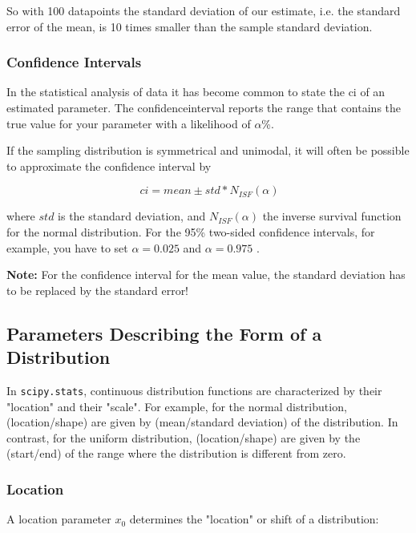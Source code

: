 So with 100 datapoints the standard deviation of our estimate, i.e. the standard error of the mean, is 10 times smaller than the sample standard deviation.

\subsubsection{Confidence Intervals}

 In the statistical analysis of data it has become common to state the \acrfull{ci} of an estimated parameter. The \gls{confidenceinterval} reports the range that contains the true value for your parameter with a likelihood of $\alpha$\%.

If the sampling distribution is symmetrical and unimodal, it will often be possible to approximate the confidence interval by

\begin{equation}\
  ci = mean \pm std * N_{ISF}(\alpha)
\end{equation}\label{eq:ci}

where $std$ is the  standard deviation, and $N_{ISF}(\alpha)$ the inverse survival function for the normal distribution. For the 95\% two-sided confidence intervals, for example, you have to set $\alpha=0.025$ and $\alpha=0.975$ .

\textbf{Note:} For the confidence interval for the mean value, the standard deviation has to be replaced by the standard error!

\subsection{Parameters Describing the Form of a Distribution}

In \texttt{scipy.stats}, continuous distribution functions are characterized by their "location" and their "scale".
For example, for the normal distribution, (location/shape) are given by (mean/standard deviation) of the distribution. In contrast, for the uniform distribution, (location/shape) are given by the (start/end) of the range where the distribution is different from zero.

\subsubsection{Location}

A \gls{location} parameter $x_0$  determines the "location" or shift of a distribution:

